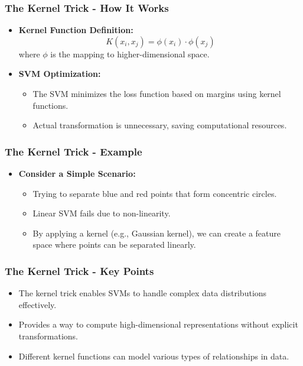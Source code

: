 \documentclass{beamer}
\begin{document}
\begin{frame}[fragile]
    \frametitle{The Kernel Trick - How It Works}
    \begin{itemize}
        \item \textbf{Kernel Function Definition:}  
            \begin{equation}
            K(x_i, x_j) = \phi(x_i) \cdot \phi(x_j)
            \end{equation}
            where $\phi$ is the mapping to higher-dimensional space.
        
        \item \textbf{SVM Optimization:} 
            \begin{itemize}
                \item The SVM minimizes the loss function based on margins using kernel functions.
                \item Actual transformation is unnecessary, saving computational resources.
            \end{itemize}
    \end{itemize}
\end{frame}

\begin{frame}[fragile]
    \frametitle{The Kernel Trick - Example}
    \begin{itemize}
        \item \textbf{Consider a Simple Scenario:} 
            \begin{itemize}
                \item Trying to separate blue and red points that form concentric circles.
                \item Linear SVM fails due to non-linearity.
                \item By applying a kernel (e.g., Gaussian kernel), we can create a feature space where points can be separated linearly.
            \end{itemize}
    \end{itemize}
\end{frame}

\begin{frame}[fragile]
    \frametitle{The Kernel Trick - Key Points}
    \begin{itemize}
        \item The kernel trick enables SVMs to handle complex data distributions effectively.
        \item Provides a way to compute high-dimensional representations without explicit transformations.
        \item Different kernel functions can model various types of relationships in data.
    \end{itemize}
\end{frame}
\end{document}
